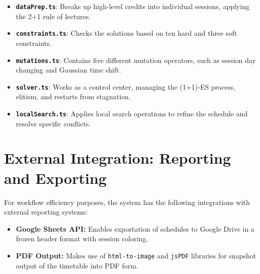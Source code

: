 \begin{itemize}
    \item \textbf{\texttt{dataPrep.ts}}: Breaks up high-level credits into individual sessions, applying the 2+1 rule of lectures.
    \item \textbf{\texttt{constraints.ts}}: Checks the solutions based on ten hard and three soft constraints.
    \item \textbf{\texttt{mutations.ts}}: Contains five different mutation operators, such as session day changing and Gaussian time shift.
    \item \textbf{\texttt{solver.ts}}: Works as a control center, managing the (1+1)-ES process, elitism, and restarts from stagnation.
    \item \textbf{\texttt{localSearch.ts}}: Applies local search operations to refine the schedule and resolve specific conflicts.
\end{itemize}

\section{External Integration: Reporting and Exporting}

For workflow efficiency purposes, the system has the following integrations with external reporting systems:
\begin{itemize}
    \item \textbf{Google Sheets API:} Enables exportation of schedules to Google Drive in a frozen header format with session coloring.
    \item \textbf{PDF Output:} Makes use of \texttt{html-to-image} and \texttt{jsPDF} libraries for snapshot output of the timetable into PDF form.
\end{itemize}